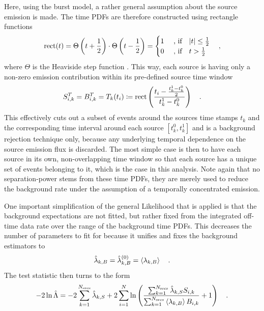 Here, using the burst model, a rather general assumption about the source emission is made.
The time PDFs are therefore constructed using rectangle functions
\begin{equation}
  \operatorname{rect}(t)
  = \Theta\left(t+\frac{1}{2}\right) \cdot \Theta\left(t-\frac{1}{2}\right)
  = \begin{cases}
      1 &\text{ , if}\quad |t| \leq \frac{1}{2} \\
      0 &\text{ , if}\quad  t    >  \frac{1}{2} \\
    \end{cases}
  \quad\text{,}
\end{equation}
where $\Theta$ is the Heaviside step function .
This way, each source is having only a non-zero emission contribution within its pre-defined source time window
\begin{equation}
  S_{i,k}^T = B_{i,k}^T = T_k(t_i) \coloneqq
    \operatorname{rect}\left(\frac{t_i - \frac{t_k^1-t_k^0}{2}}
                              {t_k^1-t_k^0}\right)
  \quad\text{.}
\end{equation}
This effectively cuts out a subset of events around the sources time stamps $t_k$ and the corresponding time interval around each source $[t_k^0, t_k^1]$ and is a background rejection technique only, because any underlying temporal dependence on the source emission flux is discarded.
The most simple case is then to have each source in its own, non-overlapping time window so that each source has a unique set of events belonging to it, which is the case in this analysis.
Note again that no separation-power stems from these time PDFs, they are merely used to reduce the background rate under the assumption of a temporally concentrated emission.

One important simplification of the general Likelihood that is applied is that the background expectations are not fitted, but rather fixed from the integrated off-time data rate over the range of the background time PDFs.
This decreases the number of parameters to fit for because it unifies and fixes the background estimators to
\begin{equation}
  \hat{\lambda}_{k,B} = \hat{\lambda}_{k,B}^{(0)} = \Braket{\lambda_{k,B}}
  \quad\text{.}
\end{equation}
The test statistic then turns to the form
\begin{equation}
  -2\ln\hat{\Lambda}
  = -2\sum_{k=1}^{N_\text{srcs}}\hat{\lambda}_{k,S} +
      2\sum_{i=1}^N \ln\left(
        \frac{\sum_{k=1}^{N_\text{srcs}}\hat{\lambda}_{k,S} S_{i,k}}
             {\sum_{k=1}^{N_\text{srcs}}\Braket{\lambda_{k,B}} B_{i,k}}
        + 1
      \right)
  \quad\text{.}
\end{equation}

